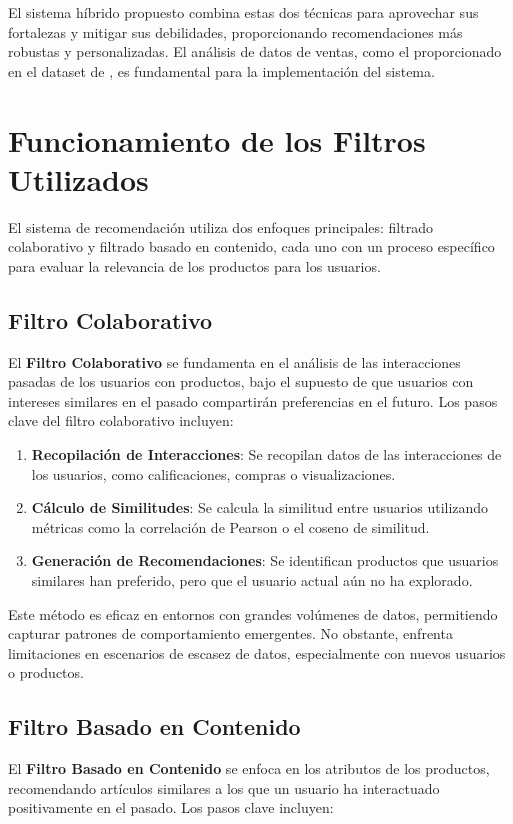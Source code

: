 \documentclass{llncs}
\begin{document}
El sistema híbrido propuesto combina estas dos técnicas para aprovechar sus fortalezas y mitigar sus debilidades, proporcionando recomendaciones más robustas y personalizadas. El análisis de datos de ventas, como el proporcionado en el dataset de \cite{dataset}, es fundamental para la implementación del sistema.

\section{Funcionamiento de los Filtros Utilizados}
El sistema de recomendación utiliza dos enfoques principales: filtrado colaborativo y filtrado basado en contenido, cada uno con un proceso específico para evaluar la relevancia de los productos para los usuarios.

\subsection{Filtro Colaborativo}
El \textbf{Filtro Colaborativo} se fundamenta en el análisis de las interacciones pasadas de los usuarios con productos, bajo el supuesto de que usuarios con intereses similares en el pasado compartirán preferencias en el futuro. Los pasos clave del filtro colaborativo incluyen:

\begin{enumerate}
    \item \textbf{Recopilación de Interacciones}: Se recopilan datos de las interacciones de los usuarios, como calificaciones, compras o visualizaciones.
    \item \textbf{Cálculo de Similitudes}: Se calcula la similitud entre usuarios utilizando métricas como la correlación de Pearson o el coseno de similitud.
    \item \textbf{Generación de Recomendaciones}: Se identifican productos que usuarios similares han preferido, pero que el usuario actual aún no ha explorado.
\end{enumerate}

Este método es eficaz en entornos con grandes volúmenes de datos, permitiendo capturar patrones de comportamiento emergentes. No obstante, enfrenta limitaciones en escenarios de escasez de datos, especialmente con nuevos usuarios o productos.

\subsection{Filtro Basado en Contenido}
El \textbf{Filtro Basado en Contenido} se enfoca en los atributos de los productos, recomendando artículos similares a los que un usuario ha interactuado positivamente en el pasado. Los pasos clave incluyen:
\end{document}
